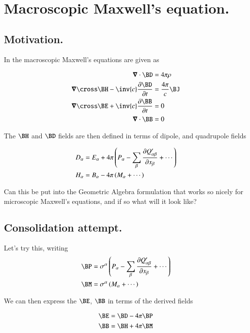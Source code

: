 \chapter{Macroscopic Maxwell's equation.}
\date{ May 28, 2009.  Last Revision: $Date: 2009/06/04 13:13:27 $ }

\section{Motivation. }

In \cite{jackson1975cew} the macroscopic Maxwell's equations are given as

\begin{align}\label{eqn:macroMax:MaxwellMixedFields}
\spacegrad \cdot \BD &= 4 \pi \rho \\
\spacegrad \cross \BH - \inv{c} \PD{t}{\BD} &= \frac{4 \pi}{c} \BJ \\
\spacegrad \cross \BE + \inv{c} \PD{t}{\BB} &= 0 \\
\spacegrad \cdot \BB &= 0
\end{align}

The $\BH$ and $\BD$ fields are then defined in terms of dipole, and quadrupole
fields

\begin{align}\label{eqn:macroMax:dipoleCoordinates}
D_\alpha &= E_\alpha + 4\pi \left( P_\alpha - \sum_\beta \PD{x_\beta}{Q'_{\alpha\beta}} + \cdots\right) \\
H_\alpha &= B_\alpha - 4\pi \left( M_\alpha + \cdots\right)
\end{align}

Can this be put into the Geometric Algebra formulation that works so
nicely for microscopic Maxwell's equations, and if so what will it look like?

\section{Consolidation attempt. }

Let's try this, writing
\begin{align}
\BP &= \sigma^\alpha \left( P_\alpha - \sum_\beta \PD{x_\beta}{Q'_{\alpha\beta}} + \cdots\right) \\
\BM &= \sigma^\alpha \left( M_\alpha + \cdots \right)
\end{align}

We can then express the $\BE$, $\BB$ in terms of the derived fields

\begin{align}
\BE &= \BD - 4\pi \BP \\
\BB &= \BH + 4\pi \BM
\end{align}

